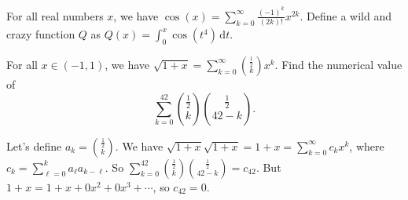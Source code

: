 \documentclass[fleqn,12pt]{exam}
\begin{document}
\begin{questions}
\begin{parts}
\end{parts}

\question For all real numbers $x$, we have
$\displaystyle
   \cos(x) = \sum_{k=0}^\infty \frac{(-1)^k}{(2k)!} x^{2 k}.
$
Define a wild and crazy function ${Q}$ as  ${Q(x)} = \int_0^x \cos \left(t^4 \right)  \, \mathrm{d} t.$


\question [1] For all $x \in (-1,1)$, we have $\displaystyle \sqrt{1+x} = \sum_{k=0}^\infty \binom{\frac{1}{2}} {k} x^k$. Find the numerical value of
\begin{equation*} 
   \sum_{k = 0}^{42} \binom{\frac{1}{2}} {k} \binom{\frac{1}{2}} {42-k}.
\end{equation*}
   
   \begin{solution}  Let's define $a_k = \binom{\frac{1}{2}} {k}$. We have
   $\sqrt{1+x} \sqrt{1+x} = 1 + x = \sum_{k=0}^\infty c_k x^k$, where $c_k = \sum_{\ell = 0}^k a_\ell a_{k-\ell}$.
   So $\sum_{k = 0}^{42} \binom{\frac{1}{2}} {k} \binom{\frac{1}{2}} {42-k} = c_{42}$.  But $1 + x = 1 + x + 0 x^2 + 0 x^3 + \cdots$, so $c_{42} = 0$.
   
   \end{solution}
  
\end{questions}
\end{document}
